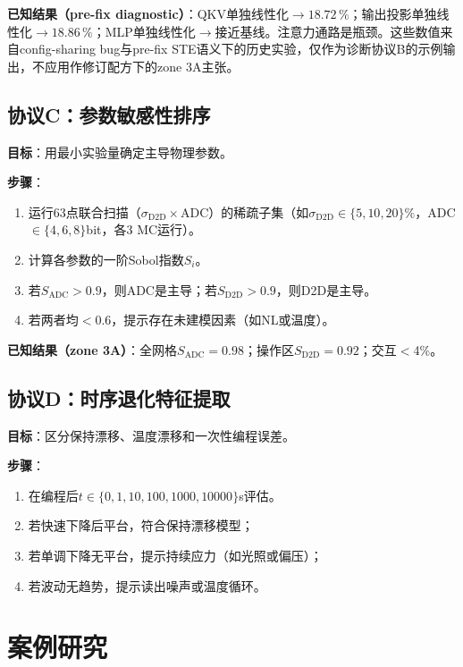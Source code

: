 \textbf{已知结果（pre-fix diagnostic）}：QKV单独线性化$\rightarrow18.72\,\%$；输出投影单独线性化$\rightarrow18.86\,\%$；MLP单独线性化$\rightarrow$接近基线。注意力通路是瓶颈。这些数值来自config-sharing bug与pre-fix STE语义下的历史实验，仅作为诊断协议B的示例输出，不应用作修订配方下的zone 3A主张。

\subsection{协议C：参数敏感性排序}
\label{subsec:protocol_c}

\textbf{目标}：用最小实验量确定主导物理参数。

\textbf{步骤}：
\begin{enumerate}
    \item 运行63点联合扫描（$\sigma_{\mathrm{D2D}}\times$ADC）的稀疏子集（如$\sigma_{\mathrm{D2D}}\in\{5,10,20\}\%$，ADC$\in\{4,6,8\}$bit，各3 MC运行）。
    \item 计算各参数的一阶Sobol指数$S_i$。
    \item 若$S_{\mathrm{ADC}}>0.9$，则ADC是主导；若$S_{\mathrm{D2D}}>0.9$，则D2D是主导。
    \item 若两者均$<$0.6，提示存在未建模因素（如NL或温度）。
\end{enumerate}

\textbf{已知结果（zone 3A）}：全网格$S_{\mathrm{ADC}}=0.98$；操作区$S_{\mathrm{D2D}}=0.92$；交互$<$4\%。

\subsection{协议D：时序退化特征提取}
\label{subsec:protocol_d}

\textbf{目标}：区分保持漂移、温度漂移和一次性编程误差。

\textbf{步骤}：
\begin{enumerate}
    \item 在编程后$t\in\{0,1,10,100,1000,10000\}$s评估。
    \item 若快速下降后平台，符合保持漂移模型；
    \item 若单调下降无平台，提示持续应力（如光照或偏压）；
    \item 若波动无趋势，提示读出噪声或温度循环。
\end{enumerate}


\section{案例研究}
\label{sec:failure_case_studies}

